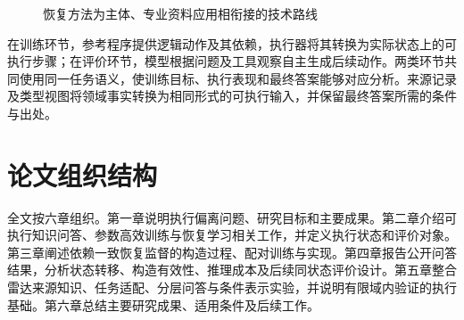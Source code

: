 \begin{figure}[htbp]
\centering
\setlength{\fboxsep}{8pt}
\caption{恢复方法为主体、专业资料应用相衔接的技术路线}
\label{fig:intro-route}
\end{figure}

在训练环节，参考程序提供逻辑动作及其依赖，执行器将其转换为实际状态上的可执行步骤；在评价环节，模型根据问题及工具观察自主生成后续动作。两类环节共同使用同一任务语义，使训练目标、执行表现和最终答案能够对应分析。来源记录及类型视图将领域事实转换为相同形式的可执行输入，并保留最终答案所需的条件与出处。



\section{论文组织结构}

全文按六章组织。第一章说明执行偏离问题、研究目标和主要成果。第二章介绍可执行知识问答、参数高效训练与恢复学习相关工作，并定义执行状态和评价对象。第三章阐述依赖一致恢复监督的构造过程、配对训练与实现。第四章报告公开问答结果，分析状态转移、构造有效性、推理成本及后续同状态评价设计。第五章整合雷达来源知识、任务适配、分层问答与条件表示实验，并说明有限域内验证的执行基础。第六章总结主要研究成果、适用条件及后续工作。
